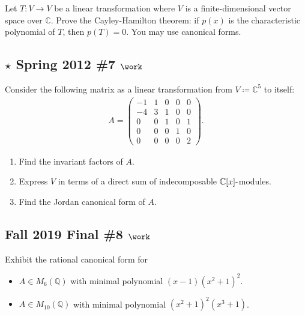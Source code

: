Let \(T:V\to V\) be a linear transformation where \(V\) is a
finite-dimensional vector space over \({\mathbb{C}}\). Prove the
Cayley-Hamilton theorem: if \(p(x)\) is the characteristic polynomial of
\(T\), then \(p(T) = 0\). You may use canonical forms.

\hypertarget{star-spring-2012-7-work}{%
\subsection{\texorpdfstring{\(\star\) Spring 2012 \#7
\(\work\)}{\textbackslash star Spring 2012 \#7 \textbackslash work}}\label{star-spring-2012-7-work}}

Consider the following matrix as a linear transformation from
\(V\coloneqq{\mathbb{C}}^5\) to itself:
\begin{align*}
A=\left(\begin{array}{ccccc}
-1 & 1 & 0 & 0 & 0 \\
-4 & 3 & 1 & 0 & 0 \\
0 & 0 & 1 & 0 & 1 \\
0 & 0 & 0 & 1 & 0 \\
0 & 0 & 0 & 0 & 2
\end{array}\right)
.\end{align*}

\begin{enumerate}
\def\labelenumi{\alph{enumi}.}
\item
  Find the invariant factors of \(A\).
\item
  Express \(V\) in terms of a direct sum of indecomposable
  \({\mathbb{C}}[x]{\hbox{-}}\)modules.
\item
  Find the Jordan canonical form of \(A\).
\end{enumerate}

\hypertarget{fall-2019-final-8-work}{%
\subsection{\texorpdfstring{Fall 2019 Final \#8
\(\work\)}{Fall 2019 Final \#8 \textbackslash work}}\label{fall-2019-final-8-work}}

Exhibit the rational canonical form for

\begin{itemize}
\tightlist
\item
  \(A\in M_6({\mathbb{Q}})\) with minimal polynomial
  \((x-1)(x^2 + 1)^2\).
\item
  \(A\in M_{10}({\mathbb{Q}})\) with minimal polynomial
  \((x^2+1)^2(x^3 + 1)\).
\end{itemize}

